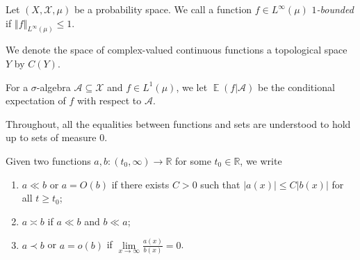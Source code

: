 \documentclass[11pt]{amsart}
\theoremstyle{definition}
\DeclareMathOperator*{\E}{\mathbb{E}}
\newcommand{\R}{{\mathbb R}}
\newcommand{\CA}{{\mathcal A}}
\newcommand{\CI}{{\mathcal I}}
\newcommand{\CX}{{\mathcal X}}
\newcommand{\bm}{{\mathbf{m}}}
\newcommand{\be}{{\mathbf{e}}}
\newcommand{\uh}{{\underline{h}}}
\newcommand{\eps}{\epsilon}
\newcommand{\ueps}{{\underline{\epsilon}}}
\newcommand{\norm}[1]{\left\Vert #1\right\Vert}
\newcommand{\inv}{^{-1}}
\newcommand{\1}{{\mathbf{1}}}
\newcommand{\abs}[1]{\mathopen{}\left| #1\mathclose{}\right|}
\newcommand{\floor}[1]{{\left \lfloor #1 \right \rfloor}}
\begin{document}


Let $(X, \CX, \mu)$ be a probability space. We call a function $f\in L^\infty(\mu)$ \emph{$1$-bounded} if $\norm{f}_{L^\infty(\mu)}\leq 1$.

We denote the space of complex-valued continuous functions a topological space $Y$ by $C(Y).$

For a $\sigma$-algebra $\CA\subseteq\CX$ and $f\in L^1(\mu)$, we let $\E(f|\CA)$ be the conditional expectation of $f$ with respect to $\CA$. %

Throughout, all the equalities between functions and sets are understood to hold up to sets of measure 0. 


Given two functions $a,b:(t_0,\infty)\to\mathbb{R}$ for some $t_0\in\R$, we write
\begin{enumerate}
    \item $a\ll b$ or $a = O(b)$ if there exists $C>0$ %
    such that $|a(x)| \leq C |b(x)|$ for all $t\geq t_0$; 
    \item $a \asymp b$ if $a\ll b$ and $b\ll a$;
    \item $a \prec b$ or $a = o(b)$  if $\lim\limits_{x\to\infty}\frac{a(x)}{b(x)} = 0$.
\end{enumerate}
\end{document}
